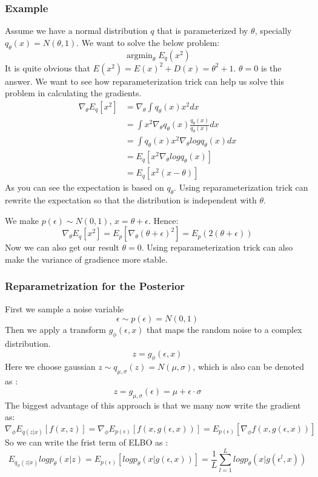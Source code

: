 \documentclass{article}
\begin{document}
\subsubsection{Example} 
Assume we have a normal distribution $q$ that is parameterized by $\theta$, specially $q_{\theta}(x)=N(\theta,1)$. We want to solve the below problem:
$$\mathop{\arg\min}_{\theta} E_{q}(x^{2})$$
It is quite obvious that $E(x^{2})=E(x)^{2}+D(x)=\theta^{2}+1$. $\theta=0$ is the answer. We want to see how reparameterization trick can help us solve this problem in calculating the gradients. 
\begin{align*}
\nabla_{\theta}E_{q}[x^{2}]&=\nabla_{\theta} \int q_{\theta}(x)x^{2}dx \\
&=  \int x^{2} \nabla_{\theta}q_{\theta}(x) \frac{q_{\theta}(x)}{q_{\theta}(x)} dx \\
&= \int q_{\theta}(x) x^{2} \nabla_{\theta} log q_{\theta}(x) dx \\
&= E_{q}[x^{2}\nabla_{\theta} logq_{\theta}(x)] \\
&= E_{q}[x^{2}(x-\theta)]
\end{align*}
As you can see the expectation is based on $q_{\theta}$. Using reparameterization trick can rewrite the expectation so that the distribution is independent with $\theta$. 

We make $p(\epsilon) \sim N (0,1)$, $x=\theta+\epsilon$. Hence: 
$$\nabla_{\theta}E_{q}[x^{2}]=E_{p}[\nabla_{\theta}(\theta+\epsilon)^{2}]=E_{p}(2(\theta+\epsilon))$$
Now we can also get our result $\theta=0$. Using reparameterization trick can also make the variance of gradience more stable.

\subsubsection{Reparametrization for the Posterior } 
First we sample a noise variable 
$$\epsilon \sim p(\epsilon)= N(0,1)$$
Then we apply a transform $g_{\phi}(\epsilon,x)$ that maps the random noise to a complex distribution. 
$$z=g_{\phi}(\epsilon,x)$$
Here we choose gaussian $z\sim q_{\mu,\sigma}(z)=N(\mu,\sigma)$, which is also can be denoted as :
$$z=g_{\mu,\sigma}(\epsilon)=\mu+\epsilon \cdot \sigma$$
The biggest advantage of this approach is that we many now write the gradient as:
$$\nabla_{\phi}E_{q(z|x)}[f(x,z)]=\nabla_{\phi}E_{p(\epsilon)}[f(x,g(\epsilon,x))]=E_{p(\epsilon)}[\nabla_{\phi}f(x,g(\epsilon,x))]$$
So we can write the frist term of ELBO as :
$$E_{q_{\phi}(z|x)}logp_{\theta}(x|z)=E_{p(\epsilon)}[logp_{\theta}(x|g(\epsilon,x))]=\frac{1}{L}\sum_{l=1}^{L}logp_{\theta}(x|g(\epsilon^{l},x)) $$
\end{document}
